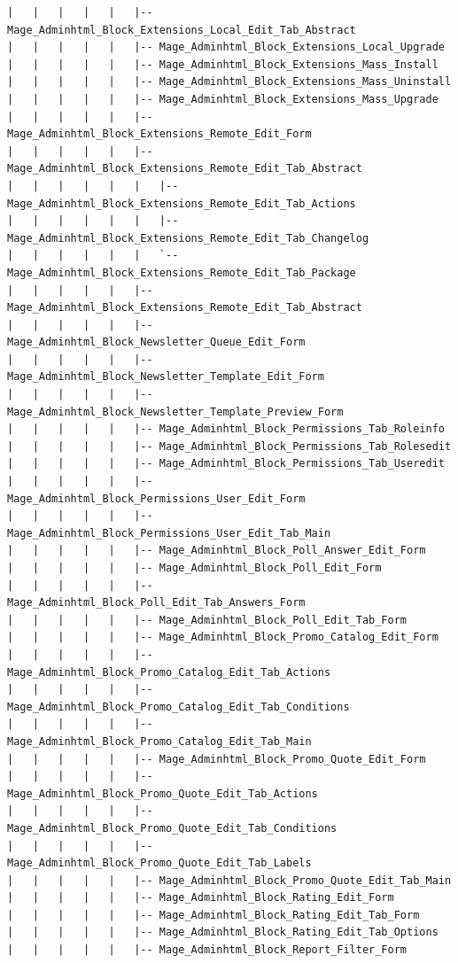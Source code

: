 \documentclass[oneside]{book}
\begin{document}
\begin{lstlisting}
|   |   |   |   |   |-- Mage_Adminhtml_Block_Extensions_Local_Edit_Tab_Abstract
|   |   |   |   |   |-- Mage_Adminhtml_Block_Extensions_Local_Upgrade
|   |   |   |   |   |-- Mage_Adminhtml_Block_Extensions_Mass_Install
|   |   |   |   |   |-- Mage_Adminhtml_Block_Extensions_Mass_Uninstall
|   |   |   |   |   |-- Mage_Adminhtml_Block_Extensions_Mass_Upgrade
|   |   |   |   |   |-- Mage_Adminhtml_Block_Extensions_Remote_Edit_Form
|   |   |   |   |   |-- Mage_Adminhtml_Block_Extensions_Remote_Edit_Tab_Abstract
|   |   |   |   |   |   |-- Mage_Adminhtml_Block_Extensions_Remote_Edit_Tab_Actions
|   |   |   |   |   |   |-- Mage_Adminhtml_Block_Extensions_Remote_Edit_Tab_Changelog
|   |   |   |   |   |   `-- Mage_Adminhtml_Block_Extensions_Remote_Edit_Tab_Package
|   |   |   |   |   |-- Mage_Adminhtml_Block_Extensions_Remote_Edit_Tab_Abstract
|   |   |   |   |   |-- Mage_Adminhtml_Block_Newsletter_Queue_Edit_Form
|   |   |   |   |   |-- Mage_Adminhtml_Block_Newsletter_Template_Edit_Form
|   |   |   |   |   |-- Mage_Adminhtml_Block_Newsletter_Template_Preview_Form
|   |   |   |   |   |-- Mage_Adminhtml_Block_Permissions_Tab_Roleinfo
|   |   |   |   |   |-- Mage_Adminhtml_Block_Permissions_Tab_Rolesedit
|   |   |   |   |   |-- Mage_Adminhtml_Block_Permissions_Tab_Useredit
|   |   |   |   |   |-- Mage_Adminhtml_Block_Permissions_User_Edit_Form
|   |   |   |   |   |-- Mage_Adminhtml_Block_Permissions_User_Edit_Tab_Main
|   |   |   |   |   |-- Mage_Adminhtml_Block_Poll_Answer_Edit_Form
|   |   |   |   |   |-- Mage_Adminhtml_Block_Poll_Edit_Form
|   |   |   |   |   |-- Mage_Adminhtml_Block_Poll_Edit_Tab_Answers_Form
|   |   |   |   |   |-- Mage_Adminhtml_Block_Poll_Edit_Tab_Form
|   |   |   |   |   |-- Mage_Adminhtml_Block_Promo_Catalog_Edit_Form
|   |   |   |   |   |-- Mage_Adminhtml_Block_Promo_Catalog_Edit_Tab_Actions
|   |   |   |   |   |-- Mage_Adminhtml_Block_Promo_Catalog_Edit_Tab_Conditions
|   |   |   |   |   |-- Mage_Adminhtml_Block_Promo_Catalog_Edit_Tab_Main
|   |   |   |   |   |-- Mage_Adminhtml_Block_Promo_Quote_Edit_Form
|   |   |   |   |   |-- Mage_Adminhtml_Block_Promo_Quote_Edit_Tab_Actions
|   |   |   |   |   |-- Mage_Adminhtml_Block_Promo_Quote_Edit_Tab_Conditions
|   |   |   |   |   |-- Mage_Adminhtml_Block_Promo_Quote_Edit_Tab_Labels
|   |   |   |   |   |-- Mage_Adminhtml_Block_Promo_Quote_Edit_Tab_Main
|   |   |   |   |   |-- Mage_Adminhtml_Block_Rating_Edit_Form
|   |   |   |   |   |-- Mage_Adminhtml_Block_Rating_Edit_Tab_Form
|   |   |   |   |   |-- Mage_Adminhtml_Block_Rating_Edit_Tab_Options
|   |   |   |   |   |-- Mage_Adminhtml_Block_Report_Filter_Form

\end{lstlisting}
\end{document}
